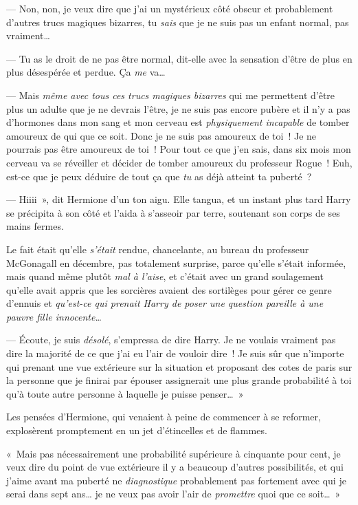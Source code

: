 --- Non, non, je veux dire que j'ai un mystérieux côté obscur et probablement d'autres trucs magiques bizarres, tu \emph{sais} que je ne suis pas un enfant normal, pas vraiment…

--- Tu as le droit de ne pas être normal, dit-elle avec la sensation d'être de plus en plus désespérée et perdue. Ça \emph{me} va…

--- Mais \emph{même avec tous ces trucs magiques bizarres} qui me permettent d'être plus un adulte que je ne devrais l'être, je ne suis pas encore pubère et il n'y a pas d'hormones dans mon sang et mon cerveau est \emph{physiquement incapable} de tomber amoureux de qui que ce soit. Donc je ne suis pas amoureux de toi~! Je ne pourrais pas être amoureux de toi~! Pour tout ce que j'en sais, dans six mois mon cerveau va se réveiller et décider de tomber amoureux du professeur Rogue~! Euh, est-ce que je peux déduire de tout ça que \emph{tu} as déjà atteint ta puberté~?

--- Hiiii~», dit Hermione d'un ton aigu. Elle tangua, et un instant plus tard Harry se précipita à son côté et l'aida à s'asseoir par terre, soutenant son corps de ses mains fermes.

Le fait était qu'elle \emph{s'était} rendue, chancelante, au bureau du professeur McGonagall en décembre, pas totalement surprise, parce qu'elle s'était informée, mais quand même plutôt \emph{mal à l'aise}, et c'était avec un grand soulagement qu'elle avait appris que les sorcières avaient des sortilèges pour gérer ce genre d'ennuis et \emph{qu'est-ce qui prenait Harry de poser une question pareille à une pauvre fille innocente…}

--- Écoute, je suis \emph{désolé}, s'empressa de dire Harry. Je ne voulais vraiment pas dire la majorité de ce que j'ai eu l'air de vouloir dire~! Je suis sûr que n'importe qui prenant une vue extérieure sur la situation et proposant des cotes de paris sur la personne que je finirai par épouser assignerait une plus grande probabilité à toi qu'à toute autre personne à laquelle je puisse penser…~»

Les pensées d'Hermione, qui venaient à peine de commencer à se reformer, explosèrent promptement en un jet d'étincelles et de flammes.

«~Mais pas nécessairement une probabilité supérieure à cinquante pour cent, je veux dire du point de vue extérieure il y a beaucoup d'autres possibilités, et qui j'aime avant ma puberté ne \emph{diagnostique} probablement pas fortement avec qui je serai dans sept ans… je ne veux pas avoir l'air de \emph{promettre} quoi que ce soit…~»


